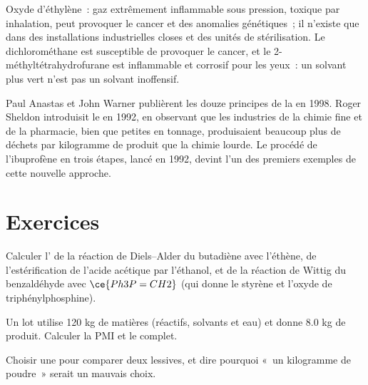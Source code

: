 \begin{safety}{}
Oxyde d'éthylène~: gaz extrêmement inflammable sous pression, toxique par
inhalation, peut provoquer le cancer et des anomalies génétiques~; il
n'existe que dans des installations industrielles closes et des unités de
stérilisation. Le dichlorométhane est susceptible de provoquer le cancer,
et le 2-méthyltétrahydrofurane est inflammable et corrosif pour les yeux~:
un solvant plus vert n'est pas un solvant inoffensif.
\end{safety}

\begin{history}
Paul Anastas et John Warner publièrent les douze principes de la  en 1998. Roger Sheldon introduisit le  en 1992, en observant
que les industries de la chimie fine et de la pharmacie, bien que petites
en tonnage, produisaient beaucoup plus de déchets par kilogramme de produit
que la chimie lourde. Le procédé de l'ibuprofène en trois étapes, lancé en
1992, devint l'un des premiers exemples de cette nouvelle approche.
\end{history}

\section{Exercices}

\begin{exercise}[$\star$]\label{exo:b3:green-industrial:1}
Calculer l' de la réaction de Diels--Alder du butadiène
avec l'éthène, de l'estérification de l'acide acétique par l'éthanol, et de la réaction de Wittig du
benzaldéhyde avec $\ce{Ph3P=CH2}$ (qui donne le styrène et l'oxyde de triphénylphosphine).
\end{exercise}

\begin{exercise}[$\star$]\label{exo:b3:green-industrial:2}
Un lot utilise 120 kg de matières (réactifs, solvants et eau) et donne
8.0 kg de produit. Calculer la PMI et le  complet.
\end{exercise}

\begin{exercise}[$\star$]\label{exo:b3:green-industrial:3}
Choisir une  pour comparer deux lessives, et dire
pourquoi «~un kilogramme de poudre~» serait un mauvais choix.
\end{exercise}

